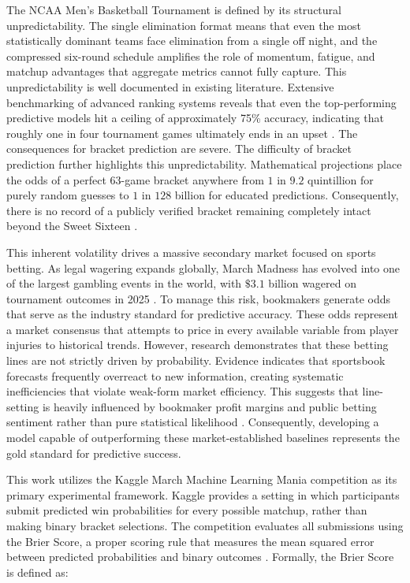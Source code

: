 \documentclass[12pt,leqno]{article}\usepackage[pdftex]{graphicx}\usepackage[dvipsnames]{xcolor}
\theoremstyle{remark}
\begin{document}
The NCAA Men's Basketball Tournament is defined by its structural unpredictability. The single elimination format means that even the most statistically dominant teams face elimination from a single off night, and the compressed six-round schedule amplifies the role of momentum, fatigue, and matchup advantages that aggregate metrics cannot fully capture. This unpredictability is well documented in existing literature. Extensive benchmarking of advanced ranking systems reveals that even the top-performing predictive models hit a ceiling of approximately 75\% accuracy, indicating that roughly one in four tournament games ultimately ends in an upset \cite{Sokol2026}. The consequences for bracket prediction are severe. The difficulty of bracket prediction further highlights this unpredictability. Mathematical projections place the odds of a perfect $63$-game bracket anywhere from $1$ in $9.2$ quintillion for purely random guesses to $1$ in $128$ billion for educated predictions. Consequently, there is no record of a publicly verified bracket remaining completely intact beyond the Sweet Sixteen \cite{Bergen2018}.

This inherent volatility drives a massive secondary market focused on sports betting. As legal wagering expands globally, March Madness has evolved into one of the largest gambling events in the world, with $\$3.1$ billion wagered on tournament outcomes in 2025 \cite{AGA2025}. To manage this risk, bookmakers generate odds that serve as the industry standard for predictive accuracy. These odds represent a market consensus that attempts to price in every available variable from player injuries to historical trends. However, research demonstrates that these betting lines are not strictly driven by probability. Evidence indicates that sportsbook forecasts frequently overreact to new information, creating systematic inefficiencies that violate weak-form market efficiency. This suggests that line-setting is heavily influenced by bookmaker profit margins and public betting sentiment rather than pure statistical likelihood \cite{Simon2024}. Consequently, developing a model capable of outperforming these market-established baselines represents the gold standard for predictive success.

This work utilizes the Kaggle March Machine Learning Mania competition as its primary experimental framework. Kaggle provides a setting in which participants submit predicted win probabilities for every possible matchup, rather than making binary bracket selections. The competition evaluates all submissions using the Brier Score, a proper scoring rule that measures the mean squared error between predicted probabilities and binary outcomes \cite{Brier1950}. Formally, the Brier Score is defined as:
\end{document}
